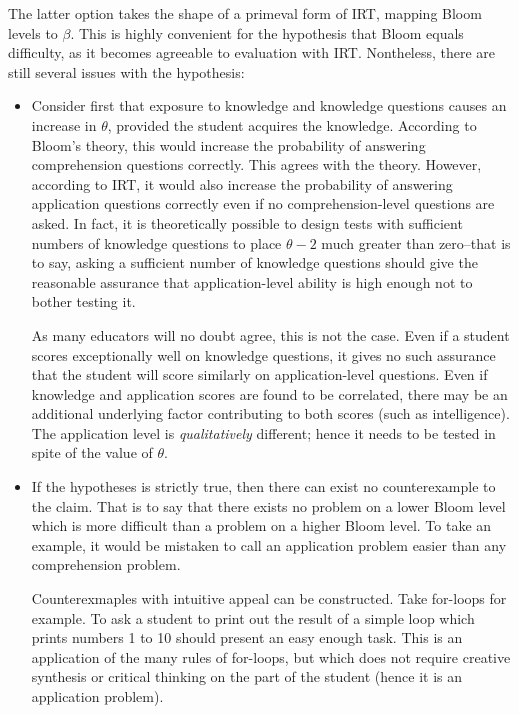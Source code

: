\documentclass[a4paper,twocolumn]{article}
\begin{document}
The latter option takes the shape of a primeval form of IRT, mapping Bloom
levels to $\beta$.  This is highly convenient for the hypothesis that Bloom
equals difficulty, as it becomes agreeable to evaluation with IRT.  Nontheless,
there are still several issues with the hypothesis:


\begin{itemize} 

\item Consider first that exposure to knowledge and knowledge questions causes
an increase in $\theta$, provided the student acquires the knowledge.
According to Bloom's theory, this would increase the probability of answering
comprehension questions correctly.  This agrees with the theory.  However,
according to IRT, it would also increase the probability of answering
application questions correctly even if no comprehension-level questions are
asked.  In fact, it is theoretically possible to design tests with sufficient
numbers of knowledge questions to place $\theta-2$ much greater than zero--that
is to say, asking a sufficient number of knowledge questions should give the
reasonable assurance that application-level ability is high enough not to
bother testing it.

As many educators will no doubt agree, this is not the case. Even if a student
scores exceptionally well on knowledge questions, it gives no such assurance
that the student will score similarly on application-level questions.  Even if
knowledge and application scores are found to be correlated, there may be an
additional underlying factor contributing to both scores (such as
intelligence).  The application level is \emph{qualitatively} different; hence
it needs to be tested in spite of the value of $\theta$.


\item If the hypotheses is strictly true, then there can exist no
counterexample to the claim.  That is to say that there exists no problem on a
lower Bloom level which is more difficult than a problem on a higher Bloom
level.  To take an example, it would be mistaken to call an application problem
easier than any comprehension problem. 

Counterexmaples with intuitive appeal can be constructed.  Take for-loops for
example.  To ask a student to print out the result of a simple loop which
prints numbers 1 to 10 should present an easy enough task.  This is an
application of the many rules of for-loops, but which does not require creative
synthesis or critical thinking on the part of the student (hence it is an
application problem). 


\end{itemize}
\end{document}
